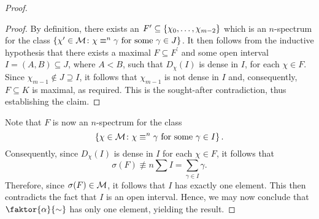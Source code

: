 \begin{proof}
\begin{proof}
		By definition, there exists an
		$F^\prime\subseteq\left\lbrace \chi_0,\dotsc,\chi_{m-2}\right\rbrace$ which is an $n$-spectrum for
		the class $\left\lbrace \chi^\prime\in\mathcal{M}\colon \chi\equiv^{n}\gamma\text{ for some
				}\gamma\in J \right\rbrace$.  It then follows from the inductive hypothesis that there exists
		a maximal $F\subseteq F^\prime$ and some open interval $I=(A,B)\subseteq J$,
		where $A<B$, such that $D_{\chi}(I)$ is dense in $I$, for each $\chi\in F$.
		Since $\chi_{m-1}\notin J\supseteq I$, it follows that $\chi_{m-1}$ is not dense
		in $I$ and, consequently, $F\subseteq K$ is maximal, as required.  This is the
		sought-after contradiction, thus establishing the claim.
	\end{proof} Note that $F$ is now an $n$-spectrum for the class
	\begin{equation} \left\lbrace \chi\in\mathcal{M}\colon \chi\equiv^{n}\gamma\text{ for some
			}\gamma\in I \right\rbrace.
	\end{equation} Consequently, since $D_{\chi}(I)$ is dense in $I$ for each
	$\chi\in F$, it follows that
	\begin{equation} \sigma(F)\nequiv{n}\sum I=\sum_{\gamma\in I}\gamma.
	\end{equation} Therefore, since $\sigma(F)\in\mathcal{M}$, it follows that $I$ has
	exactly one element.  This then contradicts the fact that $I$ is an open
	interval.  Hence, we may now conclude that $\faktor{\alpha}{\sim}$ has only one
	element, yielding the result.

\end{proof}

